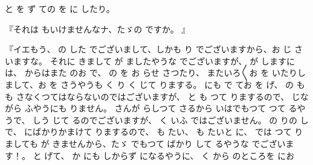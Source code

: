 と
を
ず
ての
を
に
したり。

『それは
もいけませんなナ、たゞの
ですか。
』

『イエもう、
の
した
でございまして、しかも
り
でございますから、お
じ
さいますな。
それに
きまして
が
ましたやうな
でございますが、
が
しますには、
からはまた
のお
で、
の
を
お
らせ
さつたり、
またいろ〳〵お
を
いたりしまして、お
を
さうやうも
く
り
く
じて
りまする。
にも
で
てお
を
げ、
の
も
も
さなくつてはならないのではございますが、
と
も
つて
りまするので、
じながら
ふやうにも
りません。
さんが
らしつて
さるから
いはでもつて
つて
るやうで、
しう
じて
るのでございますが、
く
いふ
ではございません。
の
りの
しで、
にばかりかまけて
りまするので、
も
たい、
も
たいと
に、
では
つて
りましても
が
きませんから、たゞ
でもつて
ばかり
して
るやうな
でございます！。
と
げて、
か
にも
しからず
になるやうに、
く
から
のところを
にお
